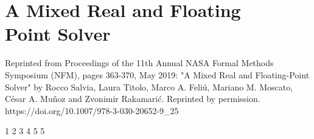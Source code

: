 
\chapter[A Mixed Real and Floating Point Solver]{A Mixed Real and Floating\\Point Solver}
\label{sec:fprock}
Reprinted from Proceedings of the 11th Annual NASA Formal Methods Symposium (NFM), pages 363-370, May 2019: "A Mixed Real and Floating-Point Solver" by Rocco Salvia, Laura Titolo, Marco A. Feli\'{u}, Mariano M. Moscato, C\'{e}sar A. Mu\~{n}oz and Zvonimir Rakamari\'c. Reprinted by permission.\\
https://doi.org/10.1007/978-3-030-20652-9\_25


\setupuuchapterbib
{}                              		{1}
		{2}
       				{3}
                      					{4}
          					{5}
                              			{5}






%
%